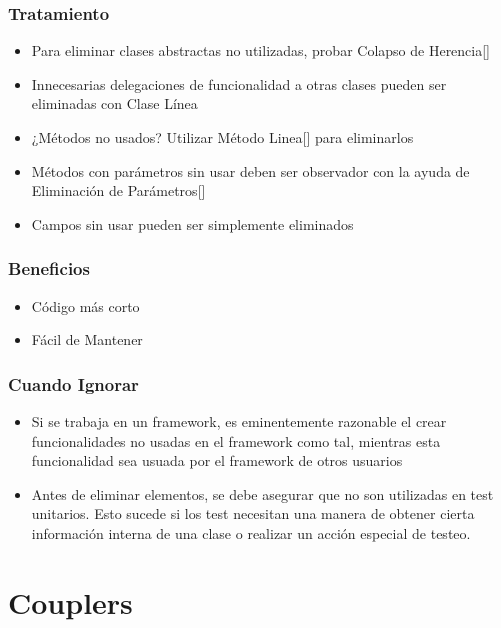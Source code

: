 \documentclass[11pt,a4paper,oneside]{book}
\begin{document}
\subsubsection{Tratamiento}
\begin{itemize}
    \item Para eliminar clases abstractas no utilizadas, probar Colapso de Herencia[\pageref{colapsehierarchy}]
    \item Innecesarias delegaciones de funcionalidad a otras clases pueden ser eliminadas con Clase Línea
    \item ¿Métodos no usados? Utilizar Método Linea[\pageref{inlinemethod}] para eliminarlos
    \item Métodos con parámetros sin usar deben ser observador con la ayuda de Eliminación de Parámetros[\pageref{removeparameter}]
    \item Campos sin usar pueden ser simplemente eliminados
\end{itemize}
\subsubsection{Beneficios}
\begin{itemize}
    \item Código más corto
    \item Fácil de Mantener
\end{itemize}
\subsubsection{Cuando Ignorar}
\begin{itemize}
    \item Si se trabaja en un framework, es eminentemente razonable el crear funcionalidades no usadas en el framework como tal, mientras esta funcionalidad sea usuada por el framework de otros usuarios
    \item Antes de eliminar elementos, se debe asegurar que no son utilizadas en test unitarios. Esto sucede si los test necesitan una manera de obtener cierta información interna de una clase o realizar un acción especial de testeo.
\end{itemize}


\section{Couplers}
\end{document}
